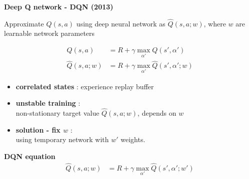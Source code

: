 \documentclass[xcolor=dvipsnames]{beamer}
\begin{document}
\begin{frame}{\bf Deep Q network - DQN (2013)}


Approximate $Q(s, a)$ using deep neural network as $\hat{Q}(s, a; w)$, where $w$ are learnable network parameters

\begin{align*}
  Q(s, a) &= R + \gamma \max \limits_{\alpha'} Q(s', \alpha') \\
  \hat{Q}(s, a; w) &= R + \gamma \max \limits_{\alpha'} \hat{Q}(s', \alpha'; w)
\end{align*}



\begin{itemize}
\item {\bf \color{red} correlated states} : experience replay buffer\\
\item {\bf \color{red} unstable training} : \\
non-stationary target value $\hat{Q}(s, a; w)$, depends on $w$
\item {\bf \color{red} solution - fix $w$} : \\
using temporary network with $w'$ weights.
\end{itemize}
{\bf DQN equation}
\begin{align*}
  \hat{Q}(s, a; w) &= R + \gamma \max \limits_{\alpha'} \hat{Q}(s', \alpha'; w') \\
  \label{eq:dqn}
\end{align*}



\end{frame}
\end{document}
